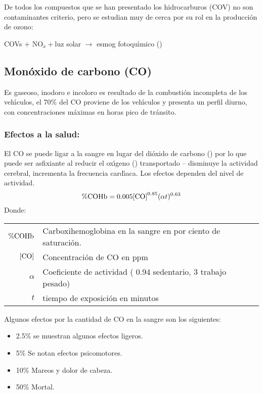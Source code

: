 De todos los compuestos que se han presentado los hidrocarburos (COV) no son contaminantes criterio, pero se estudian muy de cerca por su rol en la producción de ozono:

\begin{center}
COVs $+$ NO$_x +$luz solar $\longrightarrow$ esmog fotoqu\'{\i}mico () 
\end{center}

\subsection{Mon\'oxido de carbono (CO)}
Es gaseoso, inodoro e incoloro es resultado de la combusti\'on incompleta de los veh\'{\i}culos, el 70\% del CO proviene de los veh\'{\i}culos y presenta un perfil diurno, con concentraciones m\'aximas en horas pico de tr\'ansito.

\subsubsection{Efectos a la salud:}
El CO se puede ligar a la sangre en lugar del dióxido de carbono () por lo que puede ser asfixiante al reducir el ox\'{\i}geno () transportado -- disminuye la actividad cerebral, incrementa la frecuencia card\'{\i}aca. Los efectos dependen del nivel de actividad.
\begin{equation}
\%\ce{COHb}  = 0.005[\ce{CO]}^{0.85}(\alpha t)^{0.63}
\end{equation}
Donde:

\begin{tabular}{r @{---}l}
$\%\ce{COHb} $ & Carboxihemoglobina en la sangre en por ciento de sa\-tu\-ra\-ci\'on.\\
$[\ce{CO}]$ &Concentraci\'on de CO en ppm\\
$\alpha$ & Coeficiente de actividad ( 0.94 sedentario, 3 trabajo pesado)\\
$t$ & tiempo de exposici\'on en minutos\\
\end{tabular}

Algunos efectos por la cantidad de CO en la sangre son los siguientes:
\begin{itemize}
\item 2.5\% se muestran algunos efectos ligeros.
\item 5\% Se notan efectos psicomotores.
\item 10\% Mareos y dolor de cabeza.
\item 50\% Mortal.
\end{itemize}

